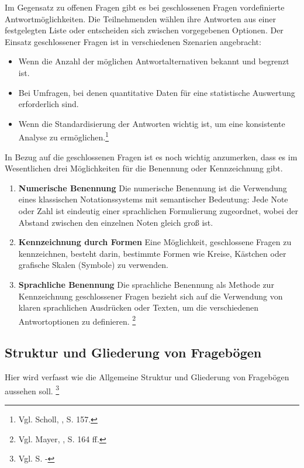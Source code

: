 Im Gegensatz zu offenen Fragen gibt es bei geschlossenen Fragen vordefinierte Antwortmöglichkeiten. Die Teilnehmenden
wählen ihre Antworten aus einer festgelegten Liste oder entscheiden sich zwischen vorgegebenen Optionen. Der Einsatz
geschlossener Fragen ist in verschiedenen Szenarien angebracht:

\begin{itemize}
    \item Wenn die Anzahl der möglichen Antwortalternativen bekannt und begrenzt ist.
    \item Bei Umfragen, bei denen quantitative Daten für eine statistische Auswertung erforderlich sind.
    \item Wenn die Standardisierung der Antworten wichtig ist, um eine konsistente Analyse zu ermöglichen.\footnote{Vgl. Scholl, \cite{Die Befragung}, S. 157.}\\
\end{itemize}

In Bezug auf die geschlossenen Fragen ist es noch wichtig anzumerken, dass es im Wesentlichen drei Möglichkeiten für die
Benennung oder Kennzeichnung gibt.
\begin{enumerate}
    \item \textbf{Numerische Benennung}
    Die numerische Benennung ist die Verwendung eines klassischen Notationssystems mit semantischer Bedeutung: Jede Note
    oder Zahl ist eindeutig einer sprachlichen Formulierung zugeordnet, wobei der Abstand zwischen den einzelnen Noten gleich groß ist.
    \item \textbf{Kennzeichnung durch Formen}
    Eine Möglichkeit, geschlossene Fragen zu kennzeichnen, besteht darin, bestimmte Formen wie Kreise, Kästchen oder
    grafische Skalen (Symbole) zu verwenden.
    \item \textbf{Sprachliche Benennung}
    Die sprachliche Benennung als Methode zur Kennzeichnung geschlossener Fragen bezieht sich auf die Verwendung von
    klaren sprachlichen Ausdrücken oder Texten, um die verschiedenen Antwortoptionen zu definieren. \footnote{Vgl. Mayer, \cite{Interview und schriftliche Befragung}, S. 164 ff.}
\end{enumerate}


\subsection{Struktur und Gliederung von Fragebögen}
Hier wird verfasst wie die Allgemeine Struktur und Gliederung von Fragebögen aussehen soll. \footnote{Vgl. \cite{Buehner} S. -}

